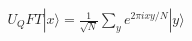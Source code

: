 \documentclass[preview]{standalone}
\begin{document}
\begin{align*}
U_QFT |x\rangle = \frac{1}{\sqrt{N}} \sum_{y}^{} e^{2πixy/N} |y\rangle
\end{align*}
\end{document}
